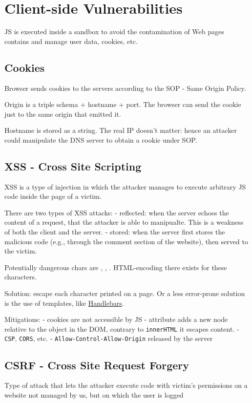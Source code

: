 \chapter{Client-side Vulnerabilities}
JS is executed inside a sandbox to avoid the contamination of 
Web pages contains and manage user data, cookies, etc.

\section{Cookies}
Browser sends cookies to the servers according to the SOP - Same Origin Policy.

Origin is a triple schema + hostname + port. The browser can send the cookie just to the same origin that emitted it.

Hostname is stored as a string. The real IP doesn't matter: hence an attacker could manipulate the DNS server to obtain a cookie under SOP.

\section{XSS - Cross Site Scripting}
XSS is a type of injection in which the attacker manages to execute arbitrary JS code inside the page of a victim.

There are two types of XSS attacks:
- reflected: when the server echoes the content of a request, that the attacker is able to manipualte. This is a weakness of both the client and the server.
- stored: when the server first stores the malicious code (e.g., through the comment section of the website), then served to the victim.

Potentially dangerous chars are \textt{<}, \textt{>}, . HTML-encoding there exists for these characters.

Solution: escape each character printed on a page. Or a less error-prone solution is the use of templates, like \href{https://handlebarsjs.com}{Handlebars}.

Mitigations:
-  cookies are not accessible by JS
-  attribute adds a new node relative to the object in the DOM, contrary to \texttt{innerHTML} it escapes content.
- \texttt{CSP}, \texttt{CORS}, etc. 
- \texttt{Allow-Control-Allow-Origin} released by the server

\section{CSRF - Cross Site Request Forgery}
Type of attack that lets the attacker execute code with victim's permissions on a website not managed by us, but on which the user is logged

